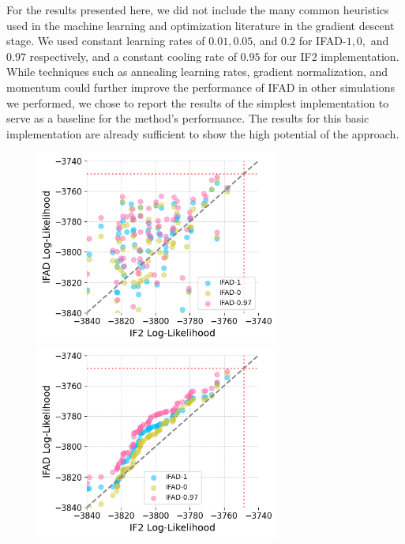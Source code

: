 \documentclass[11pt]{article}
\newcommand\arxiv[2]{#1} %
\begin{document}
For the results presented here, we did not include the many common heuristics used in the machine learning and optimization literature in the gradient descent stage.
We used constant learning rates of $0.01, 0.05$, and $0.2$ for IFAD-$1,0,$ and $0.97$ respectively, and a constant cooling rate of $0.95$ for our IF2 implementation.
While techniques such as annealing learning rates, gradient normalization, and momentum could further improve the performance of IFAD in other simulations we performed, we chose to report the results of the simplest implementation to serve as a baseline for the method's performance.
The results for this basic implementation are already sufficient to show the high potential of the approach.

\begin{figure}[htbp!]
    \includegraphics[width=\arxiv{8cm}{\textwidth/\real{4.2}}]{../imgs/095/pairs.png}
    \includegraphics[width=\arxiv{8cm}{\textwidth/\real{4.2}}]{../imgs/095/qq.png}

\end{figure}
\end{document}
